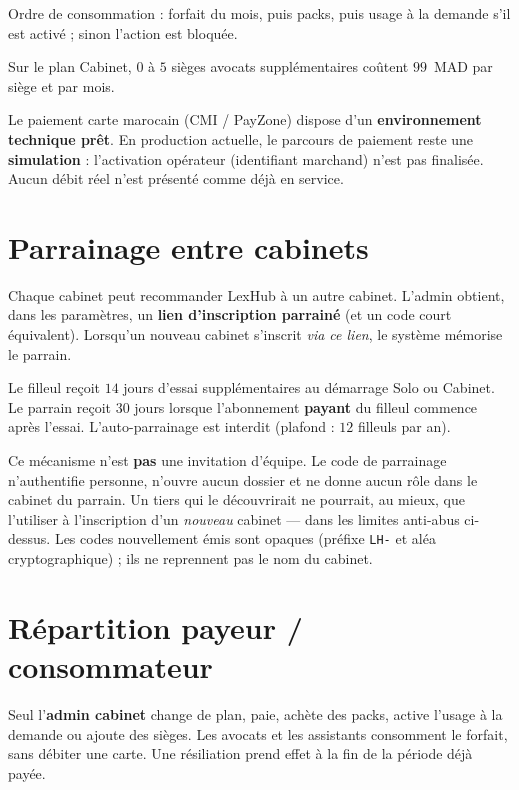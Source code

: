 Ordre de consommation : forfait du mois, puis packs, puis usage à la demande s'il est activé ; sinon l'action est bloquée.

Sur le plan Cabinet, $0$ à $5$ sièges avocats supplémentaires coûtent $99$~MAD par siège et par mois.

Le paiement carte marocain (CMI / PayZone) dispose d'un \textbf{environnement technique prêt}. En production actuelle, le parcours de paiement reste une \textbf{simulation} : l'activation opérateur (identifiant marchand) n'est pas finalisée. Aucun débit réel n'est présenté comme déjà en service.

\section{Parrainage entre cabinets}
\label{sec:parrainage}

Chaque cabinet peut recommander LexHub à un autre cabinet. L'admin obtient, dans les paramètres, un \textbf{lien d'inscription parrainé} (et un code court équivalent). Lorsqu'un nouveau cabinet s'inscrit \emph{via ce lien}, le système mémorise le parrain.

Le filleul reçoit $14$ jours d'essai supplémentaires au démarrage Solo ou Cabinet. Le parrain reçoit $30$ jours lorsque l'abonnement \textbf{payant} du filleul commence après l'essai. L'auto-parrainage est interdit (plafond : $12$ filleuls par an).

Ce mécanisme n'est \textbf{pas} une invitation d'équipe. Le code de parrainage n'authentifie personne, n'ouvre aucun dossier et ne donne aucun rôle dans le cabinet du parrain. Un tiers qui le découvrirait ne pourrait, au mieux, que l'utiliser à l'inscription d'un \emph{nouveau} cabinet --- dans les limites anti-abus ci-dessus. Les codes nouvellement émis sont opaques (préfixe \texttt{LH-} et aléa cryptographique) ; ils ne reprennent pas le nom du cabinet.

\section{Répartition payeur / consommateur}

Seul l'\textbf{admin cabinet} change de plan, paie, achète des packs, active l'usage à la demande ou ajoute des sièges. Les avocats et les assistants consomment le forfait, sans débiter une carte. Une résiliation prend effet à la fin de la période déjà payée.
